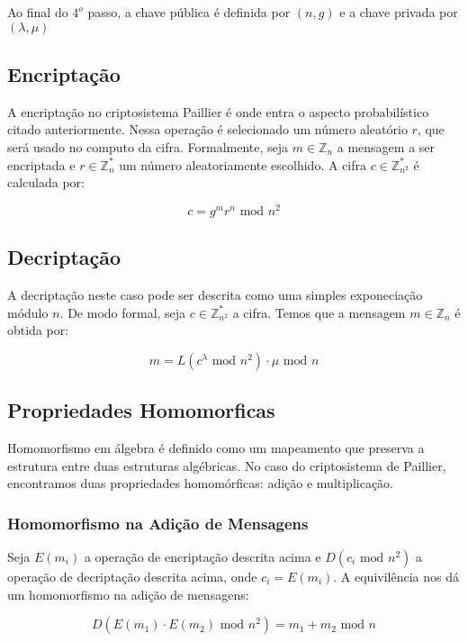 \documentclass[10pt]{article}
\begin{document}
            Ao final do $4^o$ passo, a chave pública é definida por $(n, g)$ e a chave privada por $(\lambda, \mu)$

        \subsection{Encriptação}
            A encriptação no criptosistema Paillier é onde entra o aspecto probabilístico citado anteriormente. Nessa operação é selecionado um número aleatório $r$, que será usado no computo da cifra. Formalmente, seja $m \in \mathbb{Z}_n$ a mensagem a ser encriptada e $r \in \mathbb{Z}^*_n$ um número aleatoriamente escolhido. A cifra $c \in \mathbb{Z}^*_{n^2}$ é calculada por:

            \[
            c = g^m r^n \text{ mod } n^2
            \]

        \subsection{Decriptação}
            A decriptação neste caso pode ser descrita como uma simples exponeciação módulo $n$. De modo formal, seja $c \in \mathbb{Z}^*_{n^2}$ a cifra. Temos que a mensagem $m \in \mathbb{Z}_n$ é obtida por:

            \[
            m = L(c^{\lambda} \text{ mod } n^2) \cdot \mu \text{ mod } n
            \]

        \subsection{Propriedades Homomorficas}
            Homomorfismo em álgebra é definido como um mapeamento que preserva a estrutura entre duas estruturas algébricas. No caso do criptosistema de Paillier, encontramos duas propriedades homomórficas: adição e multiplicação.

            \subsubsection{Homomorfismo na Adição de Mensagens}
                Seja $E(m_i)$ a operação de encriptação descrita acima e $D(c_i \text{ mod } n^2)$ a operação de decriptação descrita acima, onde $c_i = E(m_i)$. A equivilência nos dá um homomorfismo na adição de mensagens:

                \[
                D(E(m_1) \cdot E(m_2) \text{ mod } n^2) = m_1 + m_2 \text{ mod } n
                \]
\end{document}
